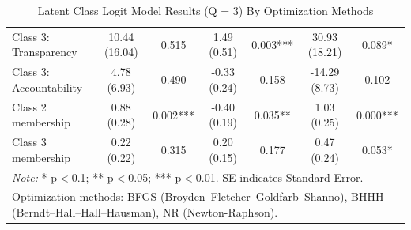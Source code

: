 \begin{table}
{\begin{tabular}{lcccccc}
Class 3: Transparency & 10.44 (16.04) & 0.515 & 1.49 (0.51) & 0.003*** & 30.93 (18.21) & 0.089* \\
Class 3: Accountability & 4.78 (6.93) & 0.490 & -0.33 (0.24) & 0.158 & -14.29 (8.73) & 0.102 \\
Class 2 membership & 0.88 (0.28) & 0.002*** & -0.40 (0.19) & 0.035** & 1.03 (0.25) & 0.000*** \\
Class 3 membership & 0.22 (0.22) & 0.315 & 0.20 (0.15) & 0.177 & 0.47 (0.24) & 0.053* \\
\hline
\multicolumn{7}{l}{\footnotesize \textit{Note:} * p$<$0.1; ** p$<$0.05; *** p$<$0.01. SE indicates Standard Error.} \\
\multicolumn{7}{l}{\footnotesize Optimization methods: BFGS (Broyden–Fletcher–Goldfarb–Shanno), BHHH (Berndt–Hall–Hall–Hausman), NR (Newton-Raphson).}
\end{tabular}%
}
\caption{Latent Class Logit Model Results (Q = 3) By Optimization Methods}
\label{tab:combined_lc_logit}
\end{table}





